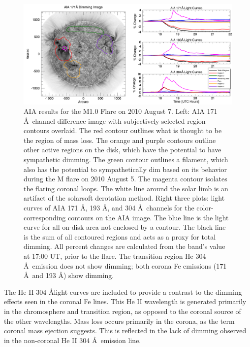 \begin{figure}[!h]
	\caption[AIA contour analysis for 2010 August 7 event]{
        AIA results for the M1.0 Flare on 2010 August 7. Left: AIA 171 \AA\ channel difference image with subjectively 
        selected region contours overlaid. The red contour outlines what is thought to be the region of mass loss. The 
        orange and purple contours outline other active regions on the disk, which have the potential to have sympathetic 
        dimming. The green contour outlines a filament, which also has the potential to sympathetically dim based on its 
        behavior during the M flare on 2010 August 5. The magenta contour isolates the flaring coronal loops. The white line 
        around the solar limb is an artifact of the solarsoft derotation method. Right three plots: light curves of AIA 171 
        \AA, 193 \AA, and 304 \AA\ channels for the color-corresponding contours on the AIA image. The blue line is the 
        light curve for all on-disk area not enclosed by a contour. The black line is the sum of all contoured regions and 
        acts as a proxy for total dimming. All percent changes are calculated from the band’s value at 17:00 UT, prior to 
        the flare. The transition region He 304 \AA\ emission does not show dimming; both corona Fe emissions (171 \AA\ and 
        193 \AA) show dimming.
	}
    \begin{center}
	    \includegraphics[width=166mm]{Images/Aia2010Aug7.png}
    \end{center}
    \label{aia2010aug7}
\end{figure}

The He II 304 \AA light curves are included to provide a contrast to the dimming effects seen in the coronal Fe lines. This He II wavelength is generated primarily in the chromosphere and transition region, as opposed to the coronal source of the other wavelengths. Mass loss occurs primarily in the corona, as the term coronal mass ejection suggests. This is reflected in the lack of dimming observed in the non-coronal He II 304 \AA\ emission line.

